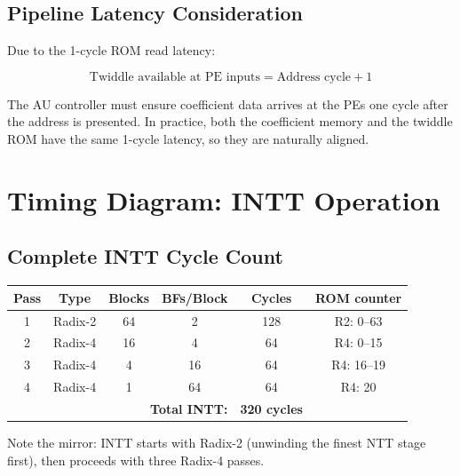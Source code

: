 \documentclass[11pt,a4paper]{article}
\begin{document}
\subsection{Pipeline Latency Consideration}

Due to the 1-cycle ROM read latency:

\begin{equation}
  \text{Twiddle available at PE inputs} = \text{Address cycle} + 1
\end{equation}

The AU controller must ensure coefficient data arrives at the PEs one cycle after the address is presented. In practice, both the coefficient memory and the twiddle ROM have the same 1-cycle latency, so they are naturally aligned.

\section{Timing Diagram: INTT Operation}
\label{sec:timing-intt}

\subsection{Complete INTT Cycle Count}

\begin{center}
\renewcommand{\arraystretch}{1.3}
\begin{tabular}{cccccc}
  \toprule
  \textbf{Pass} & \textbf{Type} & \textbf{Blocks} & \textbf{BFs/Block} & \textbf{Cycles} & \textbf{ROM counter} \\
  \midrule
  1 & Radix-2 & 64 & 2  & 128 & R2: 0--63 \\
  2 & Radix-4 & 16 & 4  & 64  & R4: 0--15 \\
  3 & Radix-4 & 4  & 16 & 64  & R4: 16--19 \\
  4 & Radix-4 & 1  & 64 & 64  & R4: 20 \\
  \midrule
  \multicolumn{4}{r}{\textbf{Total INTT:}} & \textbf{320 cycles} & \\
  \bottomrule
\end{tabular}
\end{center}

Note the mirror: INTT starts with Radix-2 (unwinding the finest NTT stage first), then proceeds with three Radix-4 passes.

\end{document}
